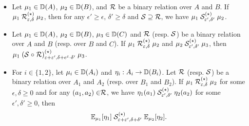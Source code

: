 \documentclass{lmcs}
\begin{document}
\begin{lem} \label{l:alift:basics}
  \begin{itemize}
  \item Let $\mu_1 \in {\mathbb{D}}(A)$, $\mu_2 \in {\mathbb{D}}(B)$, and $\mathrel{\mathcal{R}}$
    be a binary relation over $A$ and $B$. If
    $\mu_1 \mathrel{\mathrel{\mathcal{R}}^{(\star)}_{\varepsilon,\delta}} \mu_2$, then for any
    $\epsilon' \geq \epsilon$, $\delta' \geq \delta$ and
    $\mathcal{S} \supseteq \mathcal{R}$, we have
    $\mu_1 \mathrel{\mathrel{\mathcal{S}}^{(\star)}_{\varepsilon',\delta'}} \mu_2$.

  \item Let $\mu_1 \in {\mathbb{D}}(A)$, $\mu_2 \in {\mathbb{D}}(B)$,
    $\mu_3 \in {\mathbb{D}}(C)$ and $\mathcal{R}$ (resp. $\mathcal{S}$) be a binary relation
    over $A$ and $B$ (resp. over $B$ and $C$). If
    $\mu_1 \mathrel{\mathrel{\mathcal{R}}^{(\star)}_{\varepsilon,\delta}} \mu_2$ and
    $\mu_2 \mathrel{\mathrel{\mathcal{S}}^{(\star)}_{\varepsilon',\delta'}} \mu_3$,
    then
    $\mu_1 \mathrel{(\mathrel{\mathcal{S}} \circ \mathrel{\mathcal{R}})^{(\star)}_{\varepsilon +
      \varepsilon',\delta+ e^\varepsilon \cdot\delta'}} \mu_3$.

  \item For $i \in \{ 1, 2 \}$, let $\mu_i \in {\mathbb{D}}(A_i)$ and
    $\eta_i : A_i \to {\mathbb{D}}(B_i)$. Let $\mathrel{\mathcal{R}}$ (resp. $\mathrel{\mathcal{S}}$) be a binary
    relation over $A_1$ and $A_2$ (resp. over $B_1$ and $B_2$). If
    $\mu_1 \mathrel{\mathrel{\mathcal{R}}^{(\star)}_{\varepsilon,\delta}} \mu_2$
    for some $\epsilon, \delta \geq 0$ and for any
    $(a_1, a_2) \mathrel{\in} \mathrel{\mathcal{R}}$, we have
    $\eta_1(a_1) \mathrel{\mathrel{\mathcal{S}}^{(\star)}_{\varepsilon',\delta'}} \eta_2(a_2)$
    for some $\epsilon', \delta' \geq 0$,
    then
    \[ \mathbb{E}_{{\mu_1}} [{\eta_1}]
      \mathrel{\mathrel{\mathcal{S}}^{(\star)}_{\varepsilon + \varepsilon', \delta + \delta'}}
      \mathbb{E}_{{\mu_2}} [{\eta_2}] . \]
  \end{itemize}
\end{lem}
\end{document}
